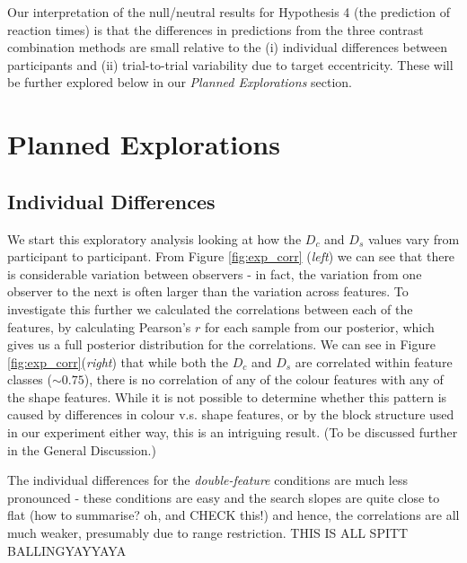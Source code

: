\documentclass[preprint,12pt,authoryear]{elsarticle}
\begin{document}
Our interpretation of the null/neutral results for Hypothesis 4 (the prediction of reaction times) is that the differences in predictions from the three contrast combination methods are small relative to the (i) individual differences between participants and (ii) trial-to-trial variability due to target eccentricity. These will be further explored below in our \textit{Planned Explorations} section.



\section{Planned Explorations}

\subsection{Individual Differences}

We start this exploratory analysis looking at how the $D_c$ and $D_s$ values vary from participant to participant. From Figure \ref{fig:exp_corr} (\textit{left}) we can see that there is considerable variation between observers - in fact, the variation from one observer to the next is often larger than the variation across features. To investigate this further we calculated the correlations between each of the features, by  calculating Pearson's $r$ for each sample from our posterior, which gives us a full posterior distribution for the correlations. We can see in Figure \ref{fig:exp_corr}(\textit{right}) that while both the $D_c$ and $D_s$ are correlated within feature classes ($\sim0.75$), there is no correlation of any of the colour features with any of the shape features. While it is not possible to determine whether this pattern is caused by differences in colour v.s. shape features, or by the block structure used in our experiment either way, this is an intriguing result. (To be discussed further in the General Discussion.)

The individual differences for the \textit{double-feature} conditions are much less pronounced - these conditions are easy and the search slopes are quite close to flat (how to summarise? oh, and CHECK this!) and hence, the correlations are all much weaker, presumably due to range restriction. THIS IS ALL SPITT BALLINGYAYYAYA
\end{document}
